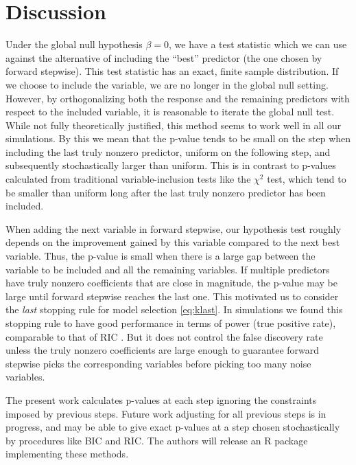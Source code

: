 \documentclass{imsart}
\begin{document}




\section{Discussion}
\label{sec:discuss}

Under the global null hypothesis $\beta = 0$, we have a test statistic
which we can use against the alternative of including the ``best''
predictor (the one chosen by forward stepwise).
This test statistic has an exact, finite sample distribution.
If we choose to include the variable, we are no longer in the global null
setting. However, by orthogonalizing both the response and the remaining
predictors with respect to the included variable, it is reasonable to
iterate the global null test. While not fully theoretically justified,
this method seems to work well in all our simulations. By this we mean that
the p-value tends to be small on the step when including the last truly
nonzero predictor, uniform on the following step, and subsequently
stochastically larger than uniform. This is in contrast to p-values
calculated from traditional variable-inclusion tests like the $\chi^2$
test, which tend to be smaller than uniform long after the last truly
nonzero predictor has been included.

When adding the next variable in forward stepwise, our hypothesis test
roughly depends on the improvement gained by this variable compared to
the next best variable. Thus, the p-value is small when there is a large
gap between the variable to be included and all the remaining variables.
If multiple predictors have truly nonzero coefficients that are close
in magnitude, the p-value may be large until forward stepwise reaches
the last one. This motivated us to consider the \textit{last} stopping
rule for model selection \eqref{eq:klast}. In simulations we
found this stopping rule to have good performance in terms of power
(true positive rate), comparable to that of RIC \citep{RIC}.
But it does not control the false discovery rate
unless the truly nonzero coefficients are large enough to guarantee
forward stepwise picks the corresponding variables before picking too
many noise variables.

The present work calculates p-values at each step ignoring the constraints
imposed by previous steps. Future work adjusting for all previous steps
is in progress, and may be able to give exact p-values at a step chosen
stochastically by procedures like BIC and RIC. The authors will
release an R package implementing these methods.
\end{document}
